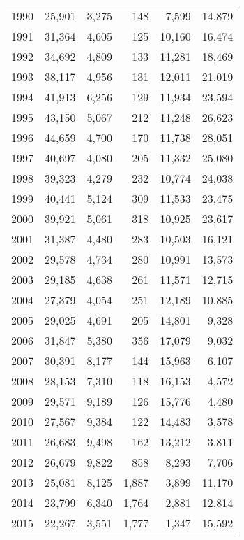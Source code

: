\documentclass[10pt, letterpaper]{article}
\begin{document}
\begin{spacing}{1.0}
\begin{table}[h!]
\begin{tabular}{rrrrrr}
        1990 & 25,901 &  3,275 &    148 &  7,599 & 14,879\\
        1991 & 31,364 &  4,605 &    125 & 10,160 & 16,474\\
        1992 & 34,692 &  4,809 &    133 & 11,281 & 18,469\\
        1993 & 38,117 &  4,956 &    131 & 12,011 & 21,019\\
        1994 & 41,913 &  6,256 &    129 & 11,934 & 23,594\\
        1995 & 43,150 &  5,067 &    212 & 11,248 & 26,623\\
        1996 & 44,659 &  4,700 &    170 & 11,738 & 28,051\\
        1997 & 40,697 &  4,080 &    205 & 11,332 & 25,080\\
        1998 & 39,323 &  4,279 &    232 & 10,774 & 24,038\\
        1999 & 40,441 &  5,124 &    309 & 11,533 & 23,475\\
        2000 & 39,921 &  5,061 &    318 & 10,925 & 23,617\\
        2001 & 31,387 &  4,480 &    283 & 10,503 & 16,121\\
        2002 & 29,578 &  4,734 &    280 & 10,991 & 13,573\\
        2003 & 29,185 &  4,638 &    261 & 11,571 & 12,715\\
        2004 & 27,379 &  4,054 &    251 & 12,189 & 10,885\\
        2005 & 29,025 &  4,691 &    205 & 14,801 &  9,328\\
        2006 & 31,847 &  5,380 &    356 & 17,079 &  9,032\\
        2007 & 30,391 &  8,177 &    144 & 15,963 &  6,107\\
        2008 & 28,153 &  7,310 &    118 & 16,153 &  4,572\\
        2009 & 29,571 &  9,189 &    126 & 15,776 &  4,480\\
        2010 & 27,567 &  9,384 &    122 & 14,483 &  3,578\\
        2011 & 26,683 &  9,498 &    162 & 13,212 &  3,811\\
        2012 & 26,679 &  9,822 &    858 &  8,293 &  7,706\\
        2013 & 25,081 &  8,125 &  1,887 &  3,899 & 11,170\\
        2014 & 23,799 &  6,340 &  1,764 &  2,881 & 12,814\\
        2015 & 22,267 &  3,551 &  1,777 &  1,347 & 15,592\\

\end{tabular}
\end{table}
\end{spacing}
\end{document}
